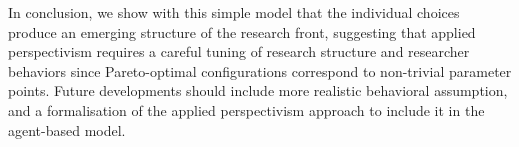 \bigskip

In conclusion, we show with this simple model that the individual choices produce an emerging structure of the research front, suggesting that applied perspectivism requires a careful tuning of research structure and researcher behaviors since Pareto-optimal configurations correspond to non-trivial parameter points. Future developments should include more realistic behavioral assumption, and a formalisation of the applied perspectivism approach to include it in the agent-based model.




\footnotesize







